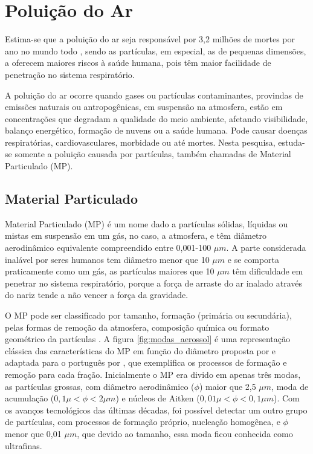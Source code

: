 \section{Poluição do Ar}

Estima-se que a poluição do ar seja responsável por 3,2 milhões de mortes 
por ano no mundo todo \citep{lim2013}, sendo as partículas, em especial, as 
de pequenas dimensões, a oferecem maiores riscos à saúde humana, pois têm 
maior facilidade de penetração no sistema respiratório.

A poluição do ar ocorre quando gases ou partículas contaminantes, 
provindas de emissões naturais ou antropogênicas, 
em suspensão na atmosfera, estão em concentrações que degradam 
a qualidade do meio ambiente, afetando visibilidade, balanço energético, 
formação de nuvens ou a saúde humana. Pode causar doenças respiratórias, 
cardiovasculares, morbidade ou até mortes. Nesta pesquisa, estuda-se somente 
a poluição causada por partículas, também chamadas de Material Particulado (MP).

\subsection{Material Particulado}

Material Particulado (MP) é um nome dado a partículas sólidas, líquidas ou 
mistas em suspensão em um gás, no caso, a atmosfera, e têm diâmetro 
aerodinâmico equivalente compreendido entre 0,001-100 $\mu m$. A parte 
considerada inalável por seres humanos tem diâmetro menor que 10 $\mu m$
e se comporta praticamente como um gás, as partículas maiores que 10 $\mu m$ 
têm dificuldade em penetrar no sistema respiratório, porque a força de arraste 
do ar inalado através do nariz tende a não vencer a força da gravidade.

O MP pode ser classificado por tamanho, formação (primária ou secundária), 
pelas formas de remoção da atmosfera, composição química ou formato 
geométrico da partículas \citep{seinfeld2012}. A figura \ref{fig:modas_aerossol} 
é uma representação clássica das características 
do MP em função do diâmetro proposta por \citet{finlayson1999} e adaptada 
para o português por \citet{oliveira2007}, que exemplifica os processos de 
formação e remoção para cada fração. Inicialmente o MP era divido em apenas 
três modas, as partículas grossas, com  diâmetro  aerodinâmico ($\phi$) 
maior que 2,5 $\mu m$, moda de acumulação ($ 0,1\mu <\phi< 2\mu m$) e 
núcleos de Aitken ($ 0,01\mu <\phi< 0,1\mu m$). Com os avanços tecnológicos
das últimas décadas, foi possível detectar um outro grupo de partículas,
com processos de formação próprio, nucleação homogênea, e $\phi$ menor que 
0,01 $\mu m$, que devido ao tamanho, essa moda ficou conhecida como ultrafinas.

